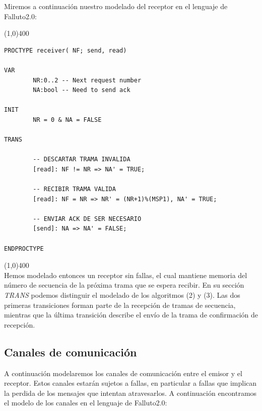 \documentclass[pdftex,a4paper,12pt]{book}
\begin{document}
Miremos a continuaci\'on nuestro modelado del receptor en el lenguaje de Falluto2.0:

\noindent \line(1,0){400}
\begin{verbatim}
PROCTYPE receiver( NF; send, read)

VAR
        NR:0..2 -- Next request number
        NA:bool -- Need to send ack

INIT
        NR = 0 & NA = FALSE

TRANS

        -- DESCARTAR TRAMA INVALIDA
        [read]: NF != NR => NA' = TRUE;

        -- RECIBIR TRAMA VALIDA
        [read]: NF = NR => NR' = (NR+1)%(MSP1), NA' = TRUE;

        -- ENVIAR ACK DE SER NECESARIO
        [send]: NA => NA' = FALSE;

ENDPROCTYPE
\end{verbatim}
\noindent \line(1,0){400}\\

Hemos modelado entonces un receptor sin fallas, el cual mantiene memoria del n\'umero de secuencia de la pr\'oxima trama que se espera recibir. En su secci\'on \textit{TRANS} podemos distinguir el modelado de los algoritmos (2) y (3). Las dos primeras transiciones forman parte de la recepci\'on de tramas de secuencia, mientras que la \'ultima transici\'on describe el env\'io de la trama de confirmaci\'on de recepci\'on.


\subsection*{Canales de comunicaci\'on}
A continuaci\'on modelaremos los canales de comunicaci\'on entre el emisor y el receptor. Estos canales estar\'an sujetos a fallas, en particular a fallas que implican la perdida de los mensajes que intentan atravesarlos. A continuaci\'on encontramos el modelo de los canales en el lenguaje de Falluto2.0:
\end{document}
